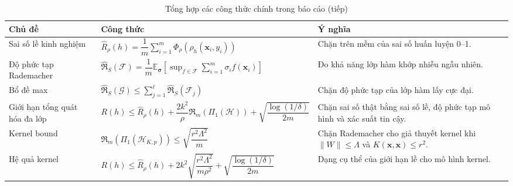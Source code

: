 \begin{table}[H]
\centering
\small
\caption{Tổng hợp các công thức chính trong báo cáo (tiếp)}
\begin{tabular}{|>{\raggedright\arraybackslash}p{3.2cm}|>{\raggedright\arraybackslash}p{5.6cm}|>{\raggedright\arraybackslash}p{5.2cm}|}
\hline
\textbf{Chủ đề} & \textbf{Công thức} & \textbf{Ý nghĩa} \\
\hline
Sai số lề kinh nghiệm
& $\widehat{R}_\rho(h)=\dfrac{1}{m}\sum_{i=1}^{m}\Phi_\rho(\rho_h(\bm{x}_i,y_i))$
& Chặn trên mềm của sai số huấn luyện 0--1. \\
\hline
Độ phức tạp Rademacher
& $\widehat{\mathfrak{R}}_S(\mathcal{F})=\dfrac{1}{m}\mathbb{E}_{\bm{\sigma}}\left[\sup_{f\in\mathcal{F}}\sum_{i=1}^{m}\sigma_i f(\bm{x}_i)\right]$
& Đo khả năng lớp hàm khớp nhiễu ngẫu nhiên. \\
\hline
Bổ đề max
& $\widehat{\mathfrak{R}}_S(\mathcal{G})\leq\sum_{j=1}^{\ell}\widehat{\mathfrak{R}}_S(\mathcal{F}_j)$
& Chặn độ phức tạp của lớp hàm lấy cực đại. \\
\hline
Giới hạn tổng quát hóa đa lớp
& $R(h)\leq\widehat{R}_\rho(h)+\dfrac{2k^2}{\rho}\mathfrak{R}_m(\Pi_1(\mathcal{H}))+\sqrt{\dfrac{\log(1/\delta)}{2m}}$
& Chặn sai số thật bằng sai số lề, độ phức tạp mô hình và xác suất tin cậy. \\
\hline
Kernel bound
& $\mathfrak{R}_m(\Pi_1(\mathcal{H}_{K,p}))\leq\sqrt{\dfrac{r^2\Lambda^2}{m}}$
& Chặn Rademacher cho giả thuyết kernel khi $\|W\|\leq\Lambda$ và $K(\bm{x},\bm{x})\leq r^2$. \\
\hline
Hệ quả kernel
& $R(h)\leq\widehat{R}_\rho(h)+2k^2\sqrt{\dfrac{r^2\Lambda^2}{m\rho^2}}+\sqrt{\dfrac{\log(1/\delta)}{2m}}$
& Dạng cụ thể của giới hạn lề cho mô hình kernel. \\
\hline
\end{tabular}
\end{table}

